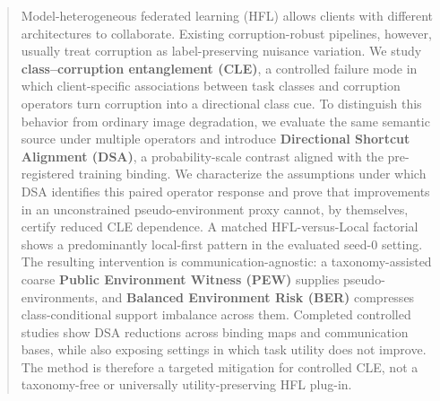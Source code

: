 \begin{abstract}

Model-heterogeneous federated learning (HFL) allows clients with different architectures to collaborate. Existing corruption-robust pipelines, however, usually treat corruption as label-preserving nuisance variation. We study \textbf{class--corruption entanglement (CLE)}, a controlled failure mode in which client-specific associations between task classes and corruption operators turn corruption into a directional class cue. To distinguish this behavior from ordinary image degradation, we evaluate the same semantic source under multiple operators and introduce \textbf{Directional Shortcut Alignment (DSA)}, a probability-scale contrast aligned with the pre-registered training binding. We characterize the assumptions under which DSA identifies this paired operator response and prove that improvements in an unconstrained pseudo-environment proxy cannot, by themselves, certify reduced CLE dependence. A matched HFL-versus-Local factorial shows a predominantly local-first pattern in the evaluated seed-0 setting. The resulting intervention is communication-agnostic: a taxonomy-assisted coarse \textbf{Public Environment Witness (PEW)} supplies pseudo-environments, and \textbf{Balanced Environment Risk (BER)} compresses class-conditional support imbalance across them. Completed controlled studies show DSA reductions across binding maps and communication bases, while also exposing settings in which task utility does not improve. The method is therefore a targeted mitigation for controlled CLE, not a taxonomy-free or universally utility-preserving HFL plug-in.
\ifdraftskeleton
{}
\fi

\end{abstract}
